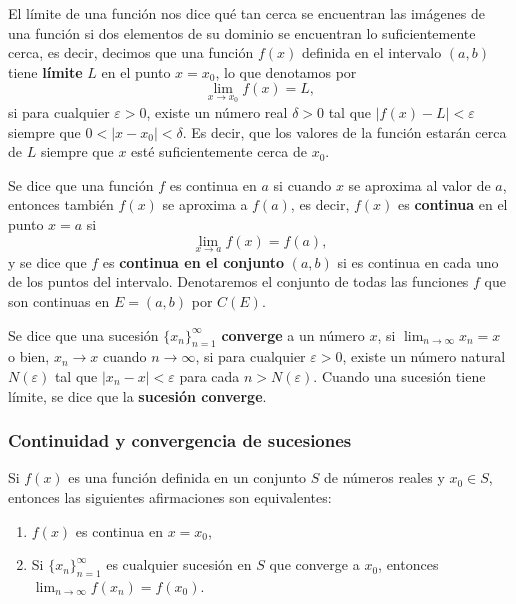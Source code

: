 \documentclass[12pt]{article}
\begin{document}
El límite de una función nos dice qué tan cerca se encuentran las imágenes de una función si dos elementos de su dominio se encuentran lo suficientemente cerca, es decir, decimos que una función $f(x)$ definida en el intervalo $(a,b)$ tiene \textbf{límite} $L$ en el punto $x = x_0$, lo que denotamos por $$\lim_{x \to x_0} f(x) = L,$$ si para cualquier $\varepsilon > 0$, existe un número real $\delta > 0$ tal que $|f(x) - L| < \varepsilon$ siempre que $0 < |x - x_0| < \delta $. Es decir, que los valores de la función estarán cerca de $L$ siempre que $x$ esté suficientemente cerca de $x_0$.
\bigskip

Se dice que una función $f$ es continua en $a$ si cuando $x$ se aproxima al valor de $a$, entonces también $f(x)$ se aproxima a $f(a)$, es decir, $f(x)$ es \textbf{continua} en el punto $x = a $ si $$\lim_{x \to a} f(x) = f(a),$$
y se dice que $f$ es \textbf{continua en el conjunto} $(a,b)$ si es continua en cada uno de los puntos del intervalo. Denotaremos el conjunto de todas las funciones $f$ que son continuas en $E=(a,b)$ por $C(E)$. \bigskip

Se dice que una sucesión $\{x_n\}_{n=1}^\infty$ \textbf{converge} a un número $x$, si
$\lim_{n \to \infty} x_n = x$ o bien, $x_n \to x$ cuando $n \to \infty$, si para cualquier $\varepsilon > 0$, existe un número natural $N(\varepsilon)$ tal que $|x_n - x| < \varepsilon$ para cada $n > N(\varepsilon)$. Cuando una sucesión tiene límite, se dice que la \textbf{sucesión converge}.

\subsubsection{Continuidad y convergencia de sucesiones}

Si $f(x)$ es una función definida en un conjunto $S$ de números reales y $x_0 \in S$, entonces las siguientes afirmaciones son equivalentes:
\begin{enumerate}
\item $f(x) $ es continua en $x = x_0 $,
\item Si $\{x_n\}_{n=1}^\infty $ es cualquier sucesión en $S $ que converge a $x_0 $, entonces $\lim_{n \to \infty} f(x_n) = f(x_0).$
\end{enumerate}
\end{document}
